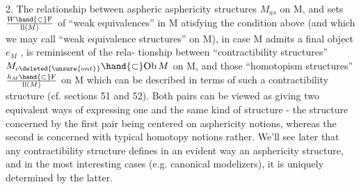 \hand{\uline{\textcolor{black}{Remarks}}} 2.  The relationship between aspheric asphericity structures
$M_{as}$ on M, and sets $W \hand{\subset} \mathrm{F}\over{\mathrm{l}}{\mathrm{l}}(M)$ of ``weak equivalences'' in M atisfying
the condition above (and which we may call ``weak equivalence structures''
on M), in case M admits a final object $e_M$ , is reminiscent of the rela-%
tionship between  ``contractibility structures'' $M_{c\deleted{\unsure{ont}}} \hand{\subset} \mathrm{Ob}\, M$ on M,
and those ``homotopism structures''  $h_M \hand{\subset} \mathrm{F}\over{\mathrm{l}}{\mathrm{l}}(M)$ on M which can be
described in terms of such a contractibility structure (cf. sections 51
and 52). Both pairs can be viewed as giving two equivalent ways of
expressing one and the same kind of structure - the structure concerned
by the first pair being centered on asphericity notions, whereas the
second is concerned with typical homotopy notions rather. We'll see
later that any contractibility structure defines in an evident way an
 asphericity structure, and in the most interesting cases (e.g. canonical
 modelizers), it is uniquely determined by the latter.

